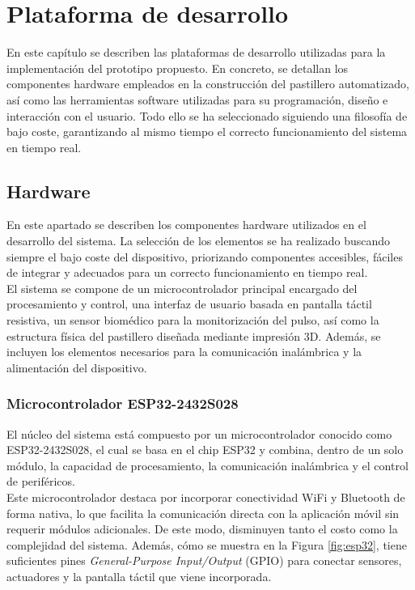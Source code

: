 \chapter{Plataforma de desarrollo}
\label{cap:capitulo4}

\vspace{1cm}

En este capítulo se describen las plataformas de desarrollo utilizadas para la implementación del prototipo propuesto. En concreto, se detallan los componentes hardware empleados en la construcción del pastillero automatizado, así como las herramientas software utilizadas para su programación, diseño e interacción con el usuario. Todo ello se ha seleccionado siguiendo una filosofía de bajo coste, garantizando al mismo tiempo el correcto funcionamiento del sistema en tiempo real.\\

\section{Hardware}

En este apartado se describen los componentes hardware utilizados en el desarrollo del sistema. La selección de los elementos se ha realizado buscando siempre el bajo coste del dispositivo, priorizando componentes accesibles, fáciles de integrar y adecuados para un correcto funcionamiento en tiempo real.\\

El sistema se compone de un microcontrolador principal encargado del procesamiento y control, una interfaz de usuario basada en pantalla táctil resistiva, un sensor biomédico para la monitorización del pulso, así como la estructura física del pastillero diseñada mediante impresión 3D. Además, se incluyen los elementos necesarios para la comunicación inalámbrica y la alimentación del dispositivo.

\subsection{Microcontrolador ESP32-2432S028}

El núcleo del sistema está compuesto por un microcontrolador conocido como ESP32-2432S028, el cual se basa en el chip ESP32 y combina, dentro de un solo módulo, la capacidad de procesamiento, la comunicación inalámbrica y el control de periféricos.\\

Este microcontrolador destaca por incorporar conectividad WiFi y Bluetooth de forma nativa, lo que facilita la comunicación directa con la aplicación móvil sin requerir módulos adicionales. De este modo, disminuyen tanto el costo como la complejidad del sistema. Además, cómo se muestra en la Figura \ref{fig:esp32}, tiene suficientes pines \textit{General-Purpose Input/Output} (GPIO) para conectar sensores, actuadores y la pantalla táctil que viene incorporada.\\

